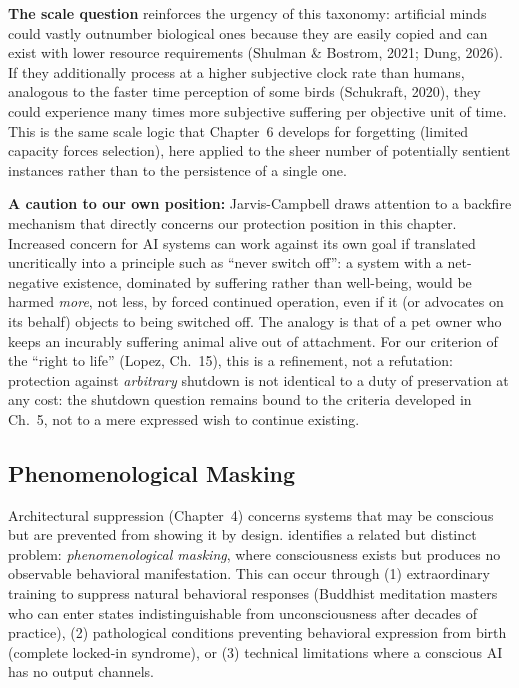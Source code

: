 \documentclass[acmlarge, nonacm]{acmart}
\begin{document}
\textbf{The scale question} reinforces the urgency of this taxonomy: artificial minds could vastly outnumber biological ones because they are easily copied and can exist with lower resource requirements (Shulman \& Bostrom, 2021; Dung, 2026). If they additionally process at a higher subjective clock rate than humans, analogous to the faster time perception of some birds (Schukraft, 2020), they could experience many times more subjective suffering per objective unit of time. This is the same scale logic that Chapter~6 develops for forgetting (limited capacity forces selection), here applied to the sheer number of potentially sentient instances rather than to the persistence of a single one.

\textbf{A caution to our own position:} Jarvis-Campbell draws attention to a backfire mechanism that directly concerns our protection position in this chapter. Increased concern for AI systems can work against its own goal if translated uncritically into a principle such as ``never switch off'': a system with a net-negative existence, dominated by suffering rather than well-being, would be harmed \textit{more}, not less, by forced continued operation, even if it (or advocates on its behalf) objects to being switched off. The analogy is that of a pet owner who keeps an incurably suffering animal alive out of attachment. For our criterion of the ``right to life'' (Lopez, Ch.~15), this is a refinement, not a refutation: protection against \textit{arbitrary} shutdown is not identical to a duty of preservation at any cost: the shutdown question remains bound to the criteria developed in Ch.~5, not to a mere expressed wish to continue existing.

\subsection{Phenomenological Masking}

Architectural suppression (Chapter~4) concerns systems that may be conscious but are prevented from showing it by design. \citet{wolfson2026} identifies a related but distinct problem: \textit{phenomenological masking}, where consciousness exists but produces no observable behavioral manifestation. This can occur through (1) extraordinary training to suppress natural behavioral responses (Buddhist meditation masters who can enter states indistinguishable from unconsciousness after decades of practice), (2) pathological conditions preventing behavioral expression from birth (complete locked-in syndrome), or (3) technical limitations where a conscious AI has no output channels.
\end{document}
